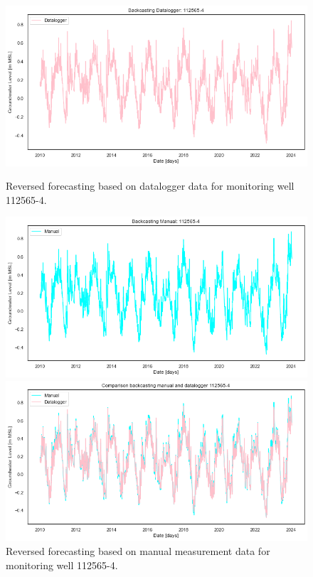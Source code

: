 \begin{figure}[htbp]
    \centering
    \begin{minipage}{0.32\textwidth}
        \centering
        \includegraphics[width=\linewidth]{figures/res roz/backdl1125654.png}
        \caption{Reversed forecasting based on datalogger data for monitoring well 112565-4.}
        \label{fig:112565-3}
    \end{minipage}
    \hfill
    \begin{minipage}{0.32\textwidth}
        \centering
        \includegraphics[width=\linewidth]{figures/res roz/backhp1125654.png}
        \caption{Reversed forecasting based on manual measurement data for monitoring well 112565-4.}
        \label{fig:112565-3}
    \end{minipage}
    \hfill
    \begin{minipage}{0.32\textwidth}
        \centering
        \includegraphics[width=\linewidth]{figures/res roz/comb1125654.png}

\end{minipage}
\end{figure}
